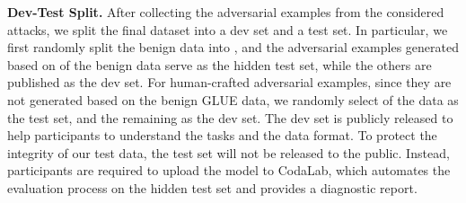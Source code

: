 \documentclass{article}
\begin{document}
\textbf{Dev-Test Split.} After collecting the adversarial examples from the considered  attacks, we split the final dataset into a dev set and a test set. In particular, we first randomly split the benign data into , and the adversarial examples generated based on  of the benign data serve as the hidden test set, while the others are published as the dev set. For human-crafted adversarial examples, since they are not generated based on the benign GLUE data, we randomly select  of the data as the test set, and the remaining  as the dev set.
The dev set is publicly released to help participants to understand the tasks and the data format. To protect the integrity of our test data, the test set will not be released to the public. Instead, participants are required to upload the model to CodaLab, which automates the evaluation process on the hidden test set and provides a diagnostic report. 
\end{document}
